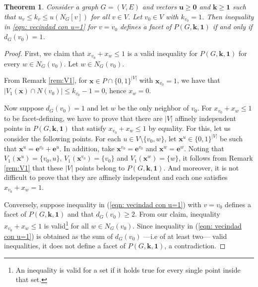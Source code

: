 \documentclass[preprint,12pt]{article}
\renewcommand{\leq}{\leqslant}
\renewcommand{\geq}{\geqslant}
\newtheorem{theorem}{Theorem}[section]
\theoremstyle{definition}
\begin{document}
\begin{theorem}
    \label{lem: edge ineq} Consider a graph $G=(V,E)$ and vectors $\mathbf{u}\geq \mathbf{0}$ and $\mathbf{k}\geq \mathbf{1}$ such that  $u_v\leq k_v\leq u(N_G[v])$  for all $v\in V$. Let $v_0\in V$ with $k_{v_0}=1$.
Then inequality in \eqref{eqn: vecindad con u=1} for $v=v_0$ defines a facet of $P(G,\mathbf{k},\mathbf{1})$ if and only if $d_G(v_0)=1$. 

\end{theorem}
\begin{proof} 
First, we claim that   $x_{v_0}+x_w\leq 1$ is a valid inequality for $P(G,\mathbf{k},\mathbf{1})$ for every $w\in N_G(v_0)$. Let $w\in N_G(v_0)$. 

From Remark \ref{rem:V1}, for $\mathbf x \in P\cap\{0,1\}^{|V|}$ with $\mathbf x_{v_0}=1$, we have that $|V_1(\mathbf x)\cap N(v_0)|\le k_{v_0}-1=0$, hence $x_w=0$.

Now suppose  $d_G(v_0)=1$ and  let $w$ be the only neighbor of $v_0$. For $x_{v_0} +  x_w \leq 1$ to be facet-defining, we have to prove  that there are $|V|$ affinely independent points in $P(G,\mathbf{k},\mathbf{1})$ that satisfy $x_{v_0} +  x_w \leq 1$ by equality. 
For this, let us consider the following points. For each $u \in V\setminus\{v_0,w\}$, 
let $\mathbf{x}^u\in \{0,1\}^{|V|}$  be such that $\mathbf{x}^u=\mathbf{e}^{v_0}+\mathbf{e}^u$. In addition, take $\mathbf{x}^{v_0}=\mathbf{e}^{v_0}$ and $\mathbf{x}^{w}=\mathbf{e}^{w}$. Noting that $V_1(\mathbf{x}^u)= \{v_0,u\}$, $V_1(\mathbf{x}^{v_0})=\{v_0\}$ and  $V_1(\mathbf{x}^{w})=\{w\}$, it follows from Remark \ref{rem:V1} that these $|V|$ points belong to $P(G,\mathbf{k},\mathbf{1})$. And moreover, it is not difficult to prove that they are affinely independent and each one satisfies $x_{v_0} + x_w=1$.

Conversely, suppose  inequality in (\ref{eqn: vecindad con u=1}) with $v=v_0$
defines a facet of $P(G,\mathbf{k},\mathbf{1})$ and that  $d_G(v_0) \geq 2$. From our claim, inequality $x_{v_0}+x_w\leq 1$ is valid\footnote{An inequality is valid for a set if it holds true for every single point inside that set.} for all $w\in N_G(v_0)$. Since inequality in (\ref{eqn: vecindad con u=1}) is obtained as the sum of $d_G(v_0)$ ---i.e of at least two--- valid inequalities, it does not define a facet of $P(G,\mathbf{k},\mathbf{1})$, a contradiction.
\end{proof}
\end{document}
